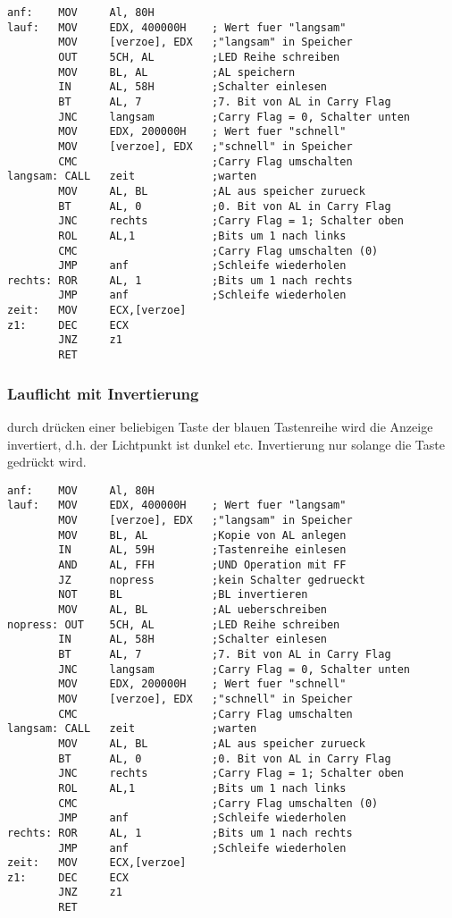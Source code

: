 \documentclass[a4paper,12pt,titlepage]{scrartcl}
\begin{document}
\begin{lstlisting}
anf:    MOV     Al, 80H
lauf:   MOV     EDX, 400000H    ; Wert fuer "langsam"
        MOV     [verzoe], EDX   ;"langsam" in Speicher
        OUT     5CH, AL         ;LED Reihe schreiben
        MOV     BL, AL          ;AL speichern
        IN      AL, 58H         ;Schalter einlesen
        BT      AL, 7           ;7. Bit von AL in Carry Flag
        JNC     langsam         ;Carry Flag = 0, Schalter unten
        MOV     EDX, 200000H    ; Wert fuer "schnell"
        MOV     [verzoe], EDX   ;"schnell" in Speicher
        CMC                     ;Carry Flag umschalten
langsam: CALL   zeit            ;warten
        MOV     AL, BL          ;AL aus speicher zurueck
        BT      AL, 0           ;0. Bit von AL in Carry Flag
        JNC     rechts          ;Carry Flag = 1; Schalter oben 
        ROL     AL,1            ;Bits um 1 nach links
        CMC                     ;Carry Flag umschalten (0)
        JMP     anf             ;Schleife wiederholen
rechts: ROR     AL, 1           ;Bits um 1 nach rechts
        JMP     anf             ;Schleife wiederholen
zeit:   MOV     ECX,[verzoe]
z1:     DEC     ECX
        JNZ     z1
        RET
\end{lstlisting}


\subsubsection*{Lauflicht mit Invertierung}
durch drücken einer beliebigen Taste der blauen Tastenreihe wird die Anzeige invertiert, d.h. der Lichtpunkt ist dunkel etc. Invertierung nur solange die Taste gedrückt wird.
\begin{lstlisting}
anf:    MOV     Al, 80H
lauf:   MOV     EDX, 400000H    ; Wert fuer "langsam"
        MOV     [verzoe], EDX   ;"langsam" in Speicher
        MOV     BL, AL          ;Kopie von AL anlegen
        IN      AL, 59H         ;Tastenreihe einlesen
        AND     AL, FFH         ;UND Operation mit FF
        JZ      nopress         ;kein Schalter gedrueckt
        NOT     BL              ;BL invertieren
        MOV     AL, BL          ;AL ueberschreiben
nopress: OUT    5CH, AL         ;LED Reihe schreiben
        IN      AL, 58H         ;Schalter einlesen
        BT      AL, 7           ;7. Bit von AL in Carry Flag
        JNC     langsam         ;Carry Flag = 0, Schalter unten
        MOV     EDX, 200000H    ; Wert fuer "schnell"
        MOV     [verzoe], EDX   ;"schnell" in Speicher
        CMC                     ;Carry Flag umschalten
langsam: CALL   zeit            ;warten
        MOV     AL, BL          ;AL aus speicher zurueck
        BT      AL, 0           ;0. Bit von AL in Carry Flag
        JNC     rechts          ;Carry Flag = 1; Schalter oben
        ROL     AL,1            ;Bits um 1 nach links
        CMC                     ;Carry Flag umschalten (0)
        JMP     anf             ;Schleife wiederholen
rechts: ROR     AL, 1           ;Bits um 1 nach rechts
        JMP     anf             ;Schleife wiederholen
zeit:   MOV     ECX,[verzoe]
z1:     DEC     ECX
        JNZ     z1
        RET
\end{lstlisting}
\end{document}
